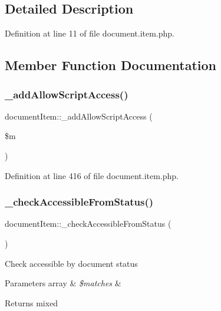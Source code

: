 \subsection{Detailed Description}


Definition at line 11 of file document.\+item.\+php.



\subsection{Member Function Documentation}
\mbox{\label{classdocumentItem_a6bc6bbe65e83e9bfc03bae1fea5b75d7}} 
\subsubsection{\texorpdfstring{\+\_\+add\+Allow\+Script\+Access()}{\_addAllowScriptAccess()}}
{\footnotesize\ttfamily document\+Item\+::\+\_\+add\+Allow\+Script\+Access (\begin{DoxyParamCaption}\item[{}]{\$m }\end{DoxyParamCaption})}



Definition at line 416 of file document.\+item.\+php.

\mbox{\label{classdocumentItem_a16bc4bb18f4e29b0244e647eb89e2f45}} 
\subsubsection{\texorpdfstring{\+\_\+check\+Accessible\+From\+Status()}{\_checkAccessibleFromStatus()}}
{\footnotesize\ttfamily document\+Item\+::\+\_\+check\+Accessible\+From\+Status (\begin{DoxyParamCaption}{ }\end{DoxyParamCaption})}

Check accessible by document status 
\begin{DoxyParams}[1]{Parameters}
array & {\em \$matches} & \\
\hline
\end{DoxyParams}
\begin{DoxyReturn}{Returns}
mixed 
\end{DoxyReturn}



